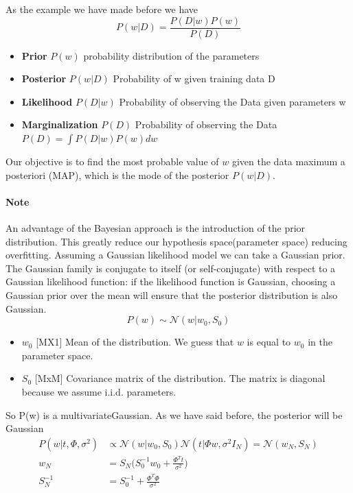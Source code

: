 \documentclass[../main.tex]{subfiles}
\begin{document}
As the example we have made before we have
\begin{equation*}
    P(w|D) = \frac{P(D|w)P(w)}{P(D)}
\end{equation*}
\begin{itemize}
    \item \textbf{Prior} $P(w)$ probability distribution of the parameters
    \item \textbf{Posterior} $P(w|D)$ Probability of w given training data D
    \item \textbf{Likelihood} $P(D|w)$ Probability of observing the Data given parameters w
    \item \textbf{Marginalization} $P(D)$ Probability of observing the Data $P(D)=\int P(D|w)P(w)dw$
\end{itemize}
Our objective is to find the most probable value of $w$ given the data maximum a
posteriori (MAP), which is the mode of the posterior $P(w|D)$.

\paragraph{Note} An advantage of the Bayesian approach is the introduction of the prior distribution. This greatly reduce our hypothesis space(parameter space) reducing overfitting.
Assuming a Gaussian likelihood model we can take a Gaussian prior.
The Gaussian family is conjugate to itself (or self-conjugate) with respect to a Gaussian likelihood function: if the likelihood function is Gaussian, choosing a Gaussian prior over the mean will ensure that the posterior distribution is also Gaussian.
\begin{equation}
    P(w) \sim \mathcal{N} (w|w_0, S_0)
\end{equation}
\begin{itemize}
    \item $w_0$ [MX1] Mean of the distribution. We guess that $w$ is equal to $w_0$ in the parameter space.
    \item $S_0$ [MxM] Covariance matrix of the distribution. The matrix is diagonal because we assume i.i.d. parameters.
\end{itemize}
So P(w) is a multivariate\footnotemark Gaussian.
As we have said before, the posterior will be Gaussian
\begin{align*}
    P(w|t, \Phi, \sigma^2) & \propto \mathcal{N} (w|w_0, S_0) \mathcal{N} (t|\Phi w, \sigma^2I_N) = \mathcal{N} (w_N,S_N) \\
    w_N                    & = S_N \bigg( S_0^{-1}w_0 + \frac{\Phi^T t}{\sigma^2} \bigg)                                  \\
    S_N^{-1}               & = S_0^{-1} + \frac{\Phi^T \Phi}{\sigma^2}
\end{align*}
\end{document}
